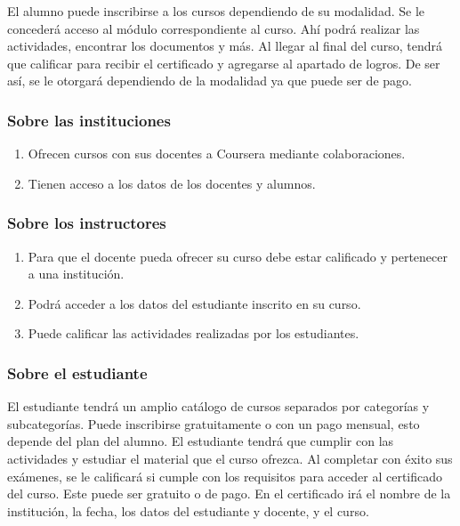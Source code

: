 \documentclass[../main.tex]{subfiles}
\begin{document}
El alumno puede inscribirse a los cursos dependiendo de su modalidad.
Se le concederá acceso al módulo correspondiente al curso. Ahí podrá
realizar las actividades, encontrar los documentos y más. Al llegar al
final del curso, tendrá que calificar para recibir el certificado y
agregarse al apartado de logros. De ser así, se le otorgará
dependiendo de la modalidad ya que puede ser de pago.

\subsubsection{Sobre las instituciones}

\begin{enumerate}
  \item Ofrecen cursos con sus docentes a Coursera mediante colaboraciones.
  \item Tienen acceso a los datos de los docentes y alumnos.
\end{enumerate}

\subsubsection{Sobre los instructores}

\begin{enumerate}
  \item Para que el docente pueda ofrecer su curso debe estar calificado
        y pertenecer a una institución.
  \item Podrá acceder a los datos del estudiante inscrito en su curso.
  \item Puede calificar las actividades realizadas por los estudiantes.
\end{enumerate}

\subsubsection{Sobre el estudiante}

El estudiante tendrá un amplio catálogo de cursos separados por categorías
y subcategorías. Puede inscribirse gratuitamente o con un pago mensual,
esto depende del plan del alumno. El estudiante tendrá que cumplir con las
actividades y estudiar el material que el curso ofrezca. Al completar con
éxito sus exámenes, se le calificará si cumple con los requisitos para
acceder al certificado del curso. Este puede ser gratuito o de pago.
En el certificado irá el nombre de la institución, la fecha, los datos
del estudiante y docente, y el curso.
\end{document}
